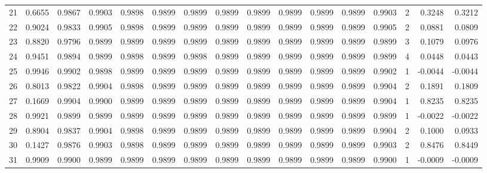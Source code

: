 \begin{tabular}{lrrrrrrrrrrrrrrr}
21  &      0.6655 &  0.9867 &  0.9903 &  0.9898 &  0.9899 &  0.9899 &  0.9899 &  0.9899 &  0.9899 &  0.9899 &   0.9899 &     0.9903 &      2 &                    0.3248 &                     0.3212 \\
22  &      0.9024 &  0.9833 &  0.9905 &  0.9898 &  0.9899 &  0.9899 &  0.9899 &  0.9899 &  0.9899 &  0.9899 &   0.9899 &     0.9905 &      2 &                    0.0881 &                     0.0809 \\
23  &      0.8820 &  0.9796 &  0.9899 &  0.9899 &  0.9899 &  0.9899 &  0.9899 &  0.9899 &  0.9899 &  0.9899 &   0.9899 &     0.9899 &      3 &                    0.1079 &                     0.0976 \\
24  &      0.9451 &  0.9894 &  0.9899 &  0.9898 &  0.9899 &  0.9898 &  0.9899 &  0.9899 &  0.9899 &  0.9899 &   0.9899 &     0.9899 &      4 &                    0.0448 &                     0.0443 \\
25  &      0.9946 &  0.9902 &  0.9898 &  0.9899 &  0.9899 &  0.9899 &  0.9899 &  0.9899 &  0.9899 &  0.9899 &   0.9899 &     0.9902 &      1 &                   -0.0044 &                    -0.0044 \\
26  &      0.8013 &  0.9822 &  0.9904 &  0.9898 &  0.9899 &  0.9899 &  0.9899 &  0.9899 &  0.9899 &  0.9899 &   0.9899 &     0.9904 &      2 &                    0.1891 &                     0.1809 \\
27  &      0.1669 &  0.9904 &  0.9900 &  0.9899 &  0.9899 &  0.9899 &  0.9899 &  0.9899 &  0.9899 &  0.9899 &   0.9899 &     0.9904 &      1 &                    0.8235 &                     0.8235 \\
28  &      0.9921 &  0.9899 &  0.9899 &  0.9899 &  0.9899 &  0.9899 &  0.9899 &  0.9899 &  0.9899 &  0.9899 &   0.9899 &     0.9899 &      1 &                   -0.0022 &                    -0.0022 \\
29  &      0.8904 &  0.9837 &  0.9904 &  0.9898 &  0.9899 &  0.9899 &  0.9899 &  0.9899 &  0.9899 &  0.9899 &   0.9899 &     0.9904 &      2 &                    0.1000 &                     0.0933 \\
30  &      0.1427 &  0.9876 &  0.9903 &  0.9898 &  0.9899 &  0.9899 &  0.9899 &  0.9899 &  0.9899 &  0.9899 &   0.9899 &     0.9903 &      2 &                    0.8476 &                     0.8449 \\
31  &      0.9909 &  0.9900 &  0.9899 &  0.9899 &  0.9899 &  0.9899 &  0.9899 &  0.9899 &  0.9899 &  0.9899 &   0.9899 &     0.9900 &      1 &                   -0.0009 &                    -0.0009 \\

\end{tabular}
